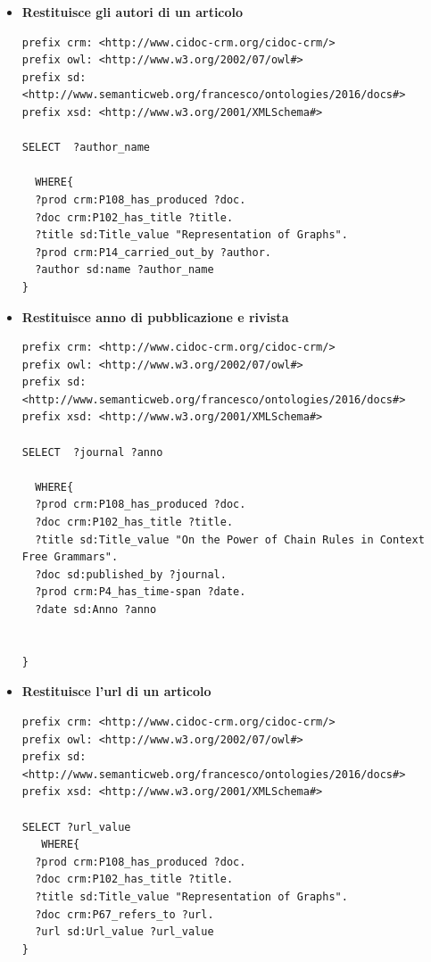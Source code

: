 \documentclass[11pt,a4paper]{article}
\begin{document}
\begin{itemize}
\item \textbf{Restituisce gli autori di un articolo}
\begin{lstlisting}[breaklines=true]
prefix crm: <http://www.cidoc-crm.org/cidoc-crm/>
prefix owl: <http://www.w3.org/2002/07/owl#>
prefix sd: <http://www.semanticweb.org/francesco/ontologies/2016/docs#>
prefix xsd: <http://www.w3.org/2001/XMLSchema#>

SELECT  ?author_name 
 
  WHERE{
  ?prod crm:P108_has_produced ?doc.
  ?doc crm:P102_has_title ?title.
  ?title sd:Title_value "Representation of Graphs".
  ?prod crm:P14_carried_out_by ?author.
  ?author sd:name ?author_name
}

\end{lstlisting}

\item \textbf{Restituisce anno di pubblicazione e rivista }
\begin{lstlisting}[breaklines=true]
prefix crm: <http://www.cidoc-crm.org/cidoc-crm/>
prefix owl: <http://www.w3.org/2002/07/owl#>
prefix sd: <http://www.semanticweb.org/francesco/ontologies/2016/docs#>
prefix xsd: <http://www.w3.org/2001/XMLSchema#>

SELECT  ?journal ?anno
 
  WHERE{
  ?prod crm:P108_has_produced ?doc.
  ?doc crm:P102_has_title ?title.
  ?title sd:Title_value "On the Power of Chain Rules in Context Free Grammars".
  ?doc sd:published_by ?journal.
  ?prod crm:P4_has_time-span ?date.
  ?date sd:Anno ?anno
 
  
}
\end{lstlisting}

\item \textbf{Restituisce l'url di un articolo}
\begin{lstlisting}[breaklines=true]
prefix crm: <http://www.cidoc-crm.org/cidoc-crm/>
prefix owl: <http://www.w3.org/2002/07/owl#>
prefix sd: <http://www.semanticweb.org/francesco/ontologies/2016/docs#>
prefix xsd: <http://www.w3.org/2001/XMLSchema#>

SELECT ?url_value
   WHERE{
  ?prod crm:P108_has_produced ?doc.
  ?doc crm:P102_has_title ?title.
  ?title sd:Title_value "Representation of Graphs".
  ?doc crm:P67_refers_to ?url.
  ?url sd:Url_value ?url_value
}

\end{lstlisting}
\end{itemize}
\end{document}
